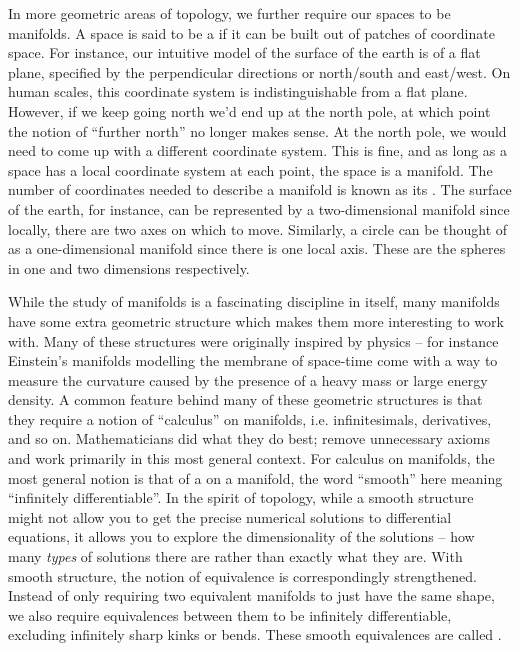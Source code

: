 In more geometric areas of topology, we further require our spaces to be manifolds.
A space is said to be a  if it can be built out of patches of coordinate space. For instance, our intuitive model of the surface of the earth is of a flat plane, specified by the perpendicular directions or north/south and east/west. On human scales, this coordinate system is indistinguishable from a flat plane. However, if we keep going north we'd end up at the north pole, at which point the notion of ``further north'' no longer makes sense. At the north pole, we would need to come up with a different coordinate system. This is fine, and as long as a space has a local coordinate system at each point, the space is a manifold. The number of coordinates needed to describe a manifold is known as its . The surface of the earth, for instance, can be represented by a two-dimensional manifold since locally, there are two axes on which to move. Similarly, a circle can be thought of as a one-dimensional manifold since there is one local axis. These are the spheres in one and two dimensions respectively.

While the study of manifolds is a fascinating discipline in itself, many manifolds have some extra geometric structure which makes them more interesting to work with. Many of these structures were originally inspired by physics -- for instance Einstein's manifolds modelling the membrane of space-time come with a way to measure the curvature caused by the presence of a heavy mass or large energy density.
A common feature behind many of these geometric structures is that they require a notion of ``calculus'' on manifolds, i.e. infinitesimals, derivatives, and so on. Mathematicians did what they do best; remove unnecessary axioms and work primarily in this most general context. For calculus on manifolds, the most general notion is that of a  on a manifold, the word ``smooth'' here meaning ``infinitely differentiable''. In the spirit of topology, while a smooth structure might not allow you to get the precise numerical solutions to differential equations, it allows you to explore the dimensionality of the solutions -- how many \emph{types} of solutions there are rather than exactly what they are. 
With smooth structure, the notion of equivalence is correspondingly strengthened.
Instead of only requiring two equivalent manifolds to just have the same shape, we also require equivalences between them to be infinitely differentiable, excluding infinitely sharp kinks or bends. These smooth equivalences are called .

